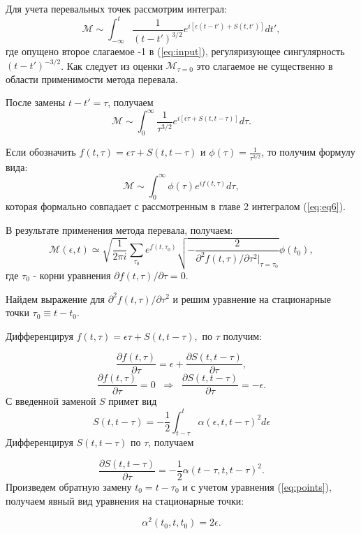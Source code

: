 \documentclass[14pt, a4paper]{article}
\numberwithin{figure}{section}
\numberwithin{equation}{section}
\newcommand{\cM}{\mathcal{M}}
\begin{document}
Для учета перевальных точек рассмотрим интеграл:
$$
\cM \sim \int_{-\infty}^{t} \frac{1}{(t-t')^{3/2}} e^{i[\epsilon (t - t') + S(t, t')]} dt',
$$
где опущено второе слагаемое -1 в (\ref{eq:input}), регуляризующее сингулярность $(t-t')^{-3/2}$. Как следует из оценки $\cM_{\tau = 0}$
это слагаемое не существенно в области применимости метода перевала.

После замены $t - t' = \tau$, получаем 
$$
\cM \sim \int_{0}^{\infty}\frac{1}{{\tau}^{3/2}}e^{i [\epsilon \tau + S(t, t-\tau)]} d\tau.
$$

Если обозначить
$
f(t, \tau) = \epsilon \tau + S(t, t-\tau) 
$ и
$
\phi(\tau) = \frac{1}{{\tau}^{3/2}} 
$, то получим формулу вида:
$$
\cM \sim \int_{0}^{\infty} \phi(\tau) e^{i f(t, \tau)} d\tau,
$$
которая формально совпадает с рассмотренным в главе 2 интегралом (\ref{eq:eq6}).

В результате применения метода перевала, получаем:
\begin{equation}
\label{an.res1}
\cM(\epsilon, t) \simeq \sqrt{\frac{1}{2\pi i }}\sum_{\tau_0}e^{f(t, \tau_0)} \sqrt{-\frac{2}{\partial^2 f(t, \tau)/\partial \tau^2|_{\tau = \tau_0}}} \phi(t_0),
\end{equation}
где $\tau_0$ - корни уравнения $\partial f(t,\tau)/\partial \tau = 0$.

Найдем выражение для $\partial^2 f(t, \tau)/\partial \tau^2$ и решим уравнение на стационарные точки $\tau_0\equiv t-t_0$.

Дифференцируя $
f(t, \tau) = \epsilon \tau + S(t, t-\tau),
$ по $\tau$ получим:

$$
\frac{\partial f(t, \tau)}{\partial \tau} = \epsilon + \frac{\partial S(t, t-\tau)}{\partial\tau},
$$
\begin{equation}\label{eq:points}
\frac{\partial f(t, \tau)}{\partial \tau}=0\;\; \Rightarrow \;\; \frac{\partial S(t, t-\tau)}{\partial\tau} = -\epsilon.
\end{equation}
С введенной заменой $S$ примет вид
$$
S(t, t-\tau) = -\frac{1}{2}\int_{t-\tau}^{t} \alpha(\epsilon, t, t-\tau)^2 d\epsilon
$$
Дифференцируя $S(t, t-\tau)$ по $\tau$, получаем

$$
\frac{\partial S(t, t-\tau)}{\partial\tau} = -\frac{1}{2} \alpha(t-\tau, t, t-\tau)^2.
$$
Произведем обратную замену $t_0 = t-\tau_0$ и с учетом уравнения (\ref{eq:points}), получаем явный вид уравнения на стационарные точки:

\begin{equation}\label{eq:solvepoints}
\alpha ^2 (t_0, t, t_0) = 2 \epsilon.
\end{equation}
\end{document}
